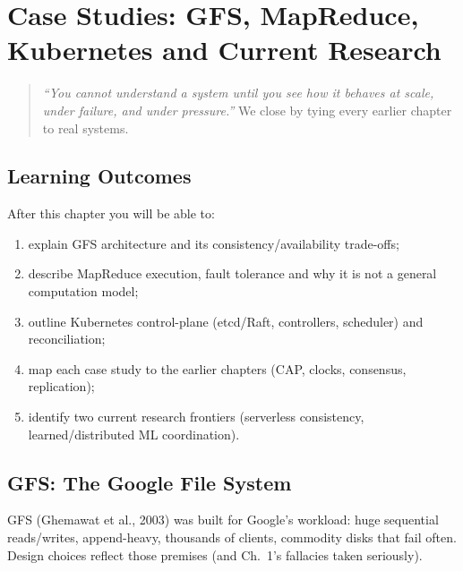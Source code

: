 \chapter{Case Studies: GFS, MapReduce, Kubernetes and Current Research}
\label{ch:case-studies}

\begin{quote}
\emph{``You cannot understand a system until you see how it behaves at scale, under failure, and under pressure.''} We close by tying every earlier chapter to real systems.
\end{quote}

\noindent{}
\vspace{0.4em}

\section*{Learning Outcomes}
After this chapter you will be able to:
\begin{enumerate}[label=(L\arabic*)]
    \item explain GFS architecture and its consistency/availability trade-offs;
    \item describe MapReduce execution, fault tolerance and why it is not a general computation model;
    \item outline Kubernetes control-plane (etcd/Raft, controllers, scheduler) and reconciliation;
    \item map each case study to the earlier chapters (CAP, clocks, consensus, replication);
    \item identify two current research frontiers (serverless consistency, learned/distributed ML coordination).
\end{enumerate}

\section{GFS: The Google File System}
\label{sec:gfs}
GFS (Ghemawat et al., 2003) was built for Google's workload: huge sequential reads/writes, append-heavy, thousands of clients, commodity disks that fail often. Design choices reflect those premises (and Ch.~1's fallacies taken seriously).

